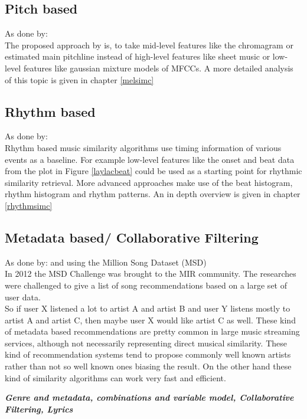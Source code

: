 \subsection{Pitch based}

As done by: \cite{pitch1}\\
The proposed approach by \cite{pitch1} is, to take mid-level features like the chromagram or estimated main pitchline instead of high-level features like sheet music or low-level features like gaussian mixture models of MFCCs. 
A more detailed analysis of this topic is given in chapter \ref{melsimc}

\subsection{Rhythm based}
As done by: \cite{rhythm1}\\
Rhythm based music similarity algorithms use timing information of various events as a baseline. 
For example low-level features like the onset and beat data from the plot in Figure \ref{laylacbeat} could be used as a starting point for rhythmic similarity retrieval. More advanced approaches make use of the beat histogram, rhythm histogram and rhythm patterns. 
An in depth overview is given in chapter \ref{rhythmsimc}

\subsection{Metadata based/ Collaborative Filtering}

As done by: \cite{metadat1} and \cite{msd4} using the Million Song Dataset (MSD) \cite{msd1}\\
In 2012 the MSD Challenge was brought to the MIR community. The researches were challenged to give a list of song recommendations based on a large set of user data.\\ 
So if user X listened a lot to artist A and artist B and user Y listens mostly to artist A and artist C, then maybe user X would like artist C as well. 
These kind of metadata based recommendations are pretty common in large music streaming services, although not necessarily representing direct musical similarity.
These kind of recommendation systems tend to propose commonly well known artists rather than not so well known ones biasing the result. 
On the other hand these kind of similarity algorithms can work very fast and efficient.  

\textbf{\textit{Genre and metadata, combinations and variable model, Collaborative Filtering, Lyrics}}

